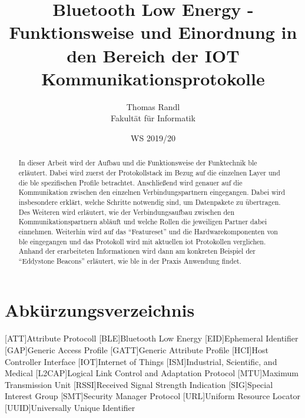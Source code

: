 \documentclass[twoside=true, %
    DIV=15
    ,%
    BCOR=15mm, %
    headinclude=true,
    footinclude=false,
    pagesize,%
    fontsize=12pt,%
    paper=a4,%
    numbers=noenddot
  ]{scrartcl}
\begin{document}
\def\figdir{figures}
\def\tabledir{tables}

\titlehead{
\raggedleft
\texttt{[image: \\figdir/logo-th-rosenheim-2019\_master\_quer\_2c.eps]}
}

\title{
\vspace*{0cm}
Bluetooth Low Energy - Funktionsweise und Einordnung in den Bereich der IOT Kommunikationsprotokolle
}

\author{
Thomas Randl\\
Fakultät für Informatik}

\date{WS 2019/20}

\maketitle

\begin{abstract}
In dieser Arbeit wird der Aufbau und die Funktionsweise der Funktechnik \ac{ble} erläutert. Dabei wird zuerst der Protokollstack im Bezug auf die einzelnen Layer und die \ac{ble} spezifischen Profile betrachtet. Anschließend wird genauer auf die Kommunikation zwischen den einzelnen Verbindungspartnern eingegangen. Dabei wird insbesondere erklärt, welche Schritte notwendig sind, um Datenpakete zu übertragen. Des Weiteren wird erläutert, wie der Verbindungsaufbau zwischen den Kommunikationspartnern abläuft und welche Rollen die jeweiligen Partner dabei einnehmen. Weiterhin wird auf das "`Featureset"' und die Hardwarekomponenten von \ac{ble} eingegangen und das Protokoll wird mit aktuellen \ac{iot} Protokollen verglichen. Anhand der erarbeiteten Informationen wird dann am konkreten Beispiel der "`Eddystone Beacons"' erläutert, wie \ac{ble} in der Praxis Anwendung findet.
\end{abstract}

\newpage

\tableofcontents

\newpage

\section*{Abkürzungsverzeichnis} %
\begin{acronym}[ECUAFFF]
	[ATT]{Attribute Protocoll}
	[BLE]{Bluetooth Low Energy}
	[EID]{Ephemeral Identifier}
	[GAP]{Generic Access Profile}
	[GATT]{Generic Attribute Profile}
	[HCI]{Host Controller Interface}
	[IOT]{Internet of Things}
	[ISM]{Industrial, Scientific, and Medical}
	[L2CAP]{Logical Link Control and Adaptation Protocol}
	[MTU]{Maximum Transmission Unit}
	[RSSI]{Received Signal Strength Indication}
	[SIG]{Special Interest Group}
	[SMT]{Security Manager Protocol}
	[URL]{Uniform Resource Locator}
	[UUID]{Universally Unique Identifier}
\end{acronym}









%




\end{document}
